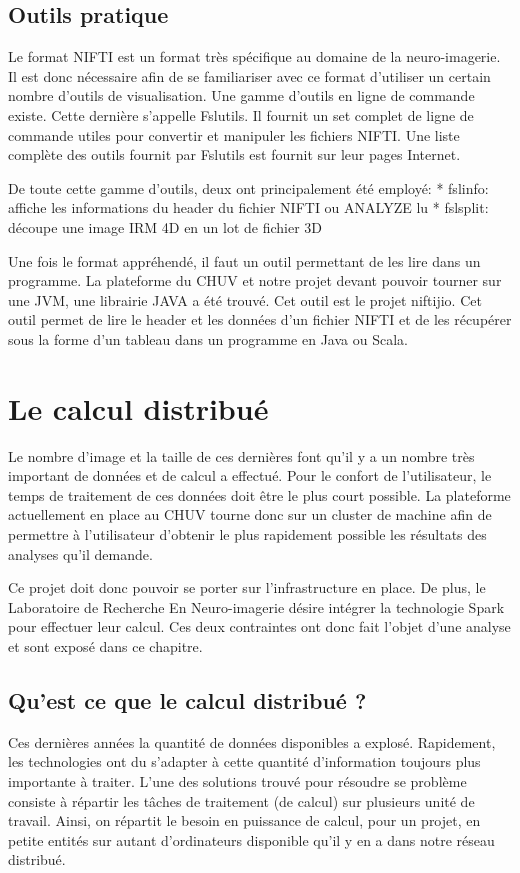 \documentclass[a4paper,10pt,openany,oneside]{sphinxmanual}
\begin{document}
\subsection{Outils pratique}
\label{index:outils-pratique}
Le format NIFTI est un format très spécifique au domaine de la neuro-imagerie. Il est donc nécessaire afin de
se familiariser avec ce format d'utiliser un certain nombre d'outils de visualisation. Une gamme d'outils en ligne
de commande existe. Cette dernière s'appelle Fslutils. Il fournit un set complet de ligne de commande utiles pour convertir
et manipuler les fichiers NIFTI. Une liste complète des outils fournit par Fslutils est fournit sur leur pages Internet.

De toute cette gamme d'outils, deux ont principalement été employé:
* fslinfo: affiche les informations du header du fichier NIFTI ou ANALYZE lu
* fslsplit: découpe une image IRM 4D en un lot de fichier 3D

Une fois le format appréhendé, il faut un outil permettant de les lire dans un programme. La plateforme du CHUV et notre projet
devant pouvoir tourner sur une JVM, une librairie JAVA a été trouvé. Cet outil est le projet niftijio. Cet outil permet de lire
le header et les données d'un fichier NIFTI et de les récupérer sous la forme d'un tableau dans un programme en Java ou Scala.


\section{Le calcul distribué}
\label{index:le-calcul-distribue}
Le nombre d'image et la taille de ces dernières font qu'il y a un nombre très important de données et de calcul a effectué.
Pour le confort de l'utilisateur, le temps de traitement de ces données doit être le plus court possible. La plateforme
actuellement en place au CHUV tourne donc sur un cluster de machine afin de permettre à l'utilisateur d'obtenir le plus rapidement
possible les résultats des analyses qu'il demande.

Ce projet doit donc pouvoir se porter sur l'infrastructure en place. De plus, le Laboratoire de Recherche En Neuro-imagerie désire
intégrer la technologie Spark pour effectuer leur calcul. Ces deux contraintes ont donc fait l'objet d'une analyse et sont exposé
dans ce chapitre.


\subsection{Qu'est ce que le calcul distribué ?}
\label{index:qu-est-ce-que-le-calcul-distribue}
Ces dernières années la quantité de données disponibles a explosé. Rapidement, les technologies ont du s'adapter à cette quantité
d'information toujours plus importante à traiter. L'une des solutions trouvé pour résoudre se problème consiste à répartir les tâches
de traitement (de calcul) sur plusieurs unité de travail. Ainsi, on répartit le besoin en puissance de calcul, pour un projet, en
petite entités sur autant d'ordinateurs disponible qu'il y en a dans notre réseau distribué.
\end{document}
